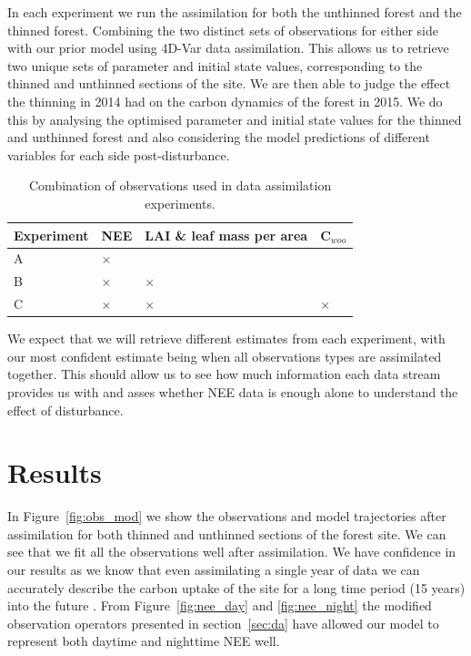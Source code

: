 \documentclass[draft,linenumbers]{agujournal}
\begin{document}
In each experiment we run the assimilation for both the unthinned forest and the thinned forest. Combining the two distinct sets of observations for either side with our prior model using 4D-Var data assimilation. This allows us to retrieve two unique sets of parameter and initial state values, corresponding to the thinned and unthinned sections of the site. We are then able to judge the effect the thinning in 2014 had on the carbon dynamics of the forest in 2015. We do this by analysing the optimised parameter and initial state values for the thinned and unthinned forest and also considering the model predictions of different variables for each side post-disturbance. 

\begin{table}[ht] 
	\caption{Combination of observations used in data assimilation experiments.}
\begin{center}
	\begin{tabular}{| l | l | l | l |}
	\hline
	Experiment & NEE & LAI \& leaf mass per area & C\(_{woo}\) \\ \hline
	A & \(\times\) &  &  \\ \hline
	B & \(\times\) & \(\times\) &  \\ \hline
	C & \(\times\) & \(\times\) & \(\times\)  \\ \hline
	\end{tabular}
	\label{table:obs_da}
\end{center} 
\end{table}

We expect that we will retrieve different estimates from each experiment, with our most confident estimate being when all observations types are assimilated together. This should allow us to see how much information each data stream provides us with and asses whether NEE data is enough alone to understand the effect of disturbance.

\section{Results} \label{sec:results}

In Figure~\ref{fig:obs_mod} we show the observations and model trajectories after assimilation for both thinned and unthinned sections of the forest site. We can see that we fit all the observations well after assimilation. We have confidence in our results as we know that even assimilating a single year of data we can accurately describe the carbon uptake of the site for a long time period (15 years) into the future \citep{Pinnington2016299}. From Figure~\ref{fig:nee_day} and \ref{fig:nee_night} the modified observation operators presented in section~\ref{sec:da} have allowed our model to represent both daytime and nighttime NEE well. 
\end{document}
